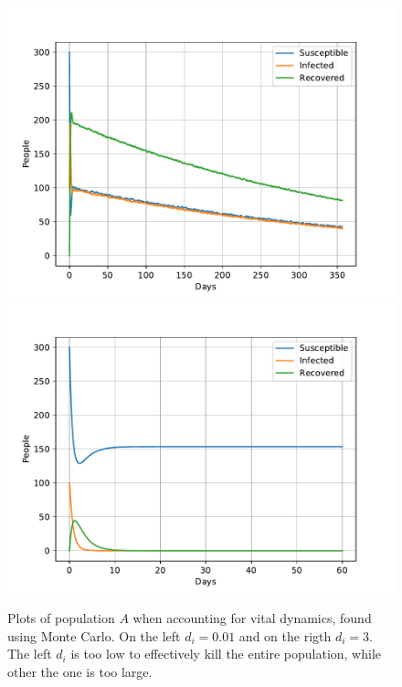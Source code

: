 \documentclass[a4paper]{article}
\begin{document}
	\begin{figure}[!htb]
		\centering 
		\includegraphics[scale=0.56]{../plots/opp_c_k3_MC.pdf} %
		\includegraphics[scale=0.56]{../plots/opp_c_k0_MC.pdf}
		\caption{Plots of population $A$ when accounting for vital dynamics, found using Monte Carlo. On the left $d_i=0.01$ and on the rigth $d_i=3$. The left $d_i$ is too low to effectively kill the entire population, while other the one is too large.}
		\label{opp_c0_MC}
	\end{figure}
	
\end{document}
